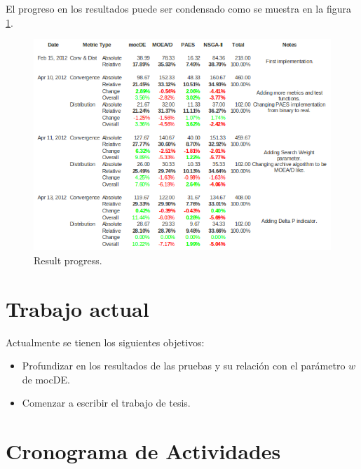 \documentclass[english]{article}
\begin{document}

El progreso en los resultados puede ser condensado como se muestra en la figura \ref{fig:progress}.

\begin{figure}
\includegraphics[scale=0.6]{images/progress}
\caption{\label{fig:progress} Result progress.}
\end{figure}


\section*{Trabajo actual}

Actualmente se tienen los siguientes objetivos:
\begin{itemize}
\item Profundizar en los resultados de las pruebas y su relación con el parámetro $w$ de mocDE.
\item Comenzar a escribir el trabajo de tesis.
\end{itemize}


\section*{Cronograma de Actividades}
\end{document}

